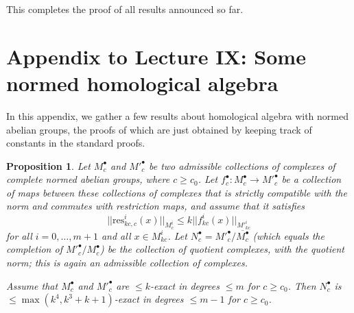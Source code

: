 \documentclass[11pt]{amsbook}
\numberwithin{equation}{section}
\numberwithin{theorem}{section}
\newtheorem{proposition}[theorem]{Proposition}
\theoremstyle{definition}
\begin{document}
This completes the proof of all results announced so far.

\newpage

\section*{Appendix to Lecture IX: Some normed homological algebra}

In this appendix, we gather a few results about homological algebra with normed abelian groups, the proofs of which are just obtained by keeping track of constants in the standard proofs.


\begin{proposition}\label{prop:snakelemma} Let $M^\bullet_c$ and $M'^\bullet_c$ be two admissible collections of complexes of complete normed abelian groups, where $c\geq c_0$. Let $f^\bullet_c: M^\bullet_c\to M'^\bullet_c$ be a collection of maps between these collections of complexes that is strictly compatible with the norm and commutes with restriction maps, and assume that it satisfies
\[
||\mathrm{res}^i_{kc,c}(x)||_{M^i_c}\leq k||f^i_{kc}(x)||_{M'^i_{kc}}
\]
for all $i=0,\ldots,m+1$ and all $x\in M^i_{kc}$. Let $N^\bullet_c=M'^\bullet_c/\overline{M^\bullet_c}$ (which equals the completion of $M'^{\bullet}_c/M^\bullet_c$) be the collection of quotient complexes, with the quotient norm; this is again an admissible collection of complexes.

Assume that $M^\bullet_c$ and $M'^\bullet_c$ are $\leq k$-exact in degrees $\leq m$ for $c\geq c_0$. Then $N^\bullet_c$ is $\leq \max(k^4,k^3+k+1)$-exact in degrees $\leq m-1$ for $c\geq c_0$.
\end{proposition}
\end{document}
